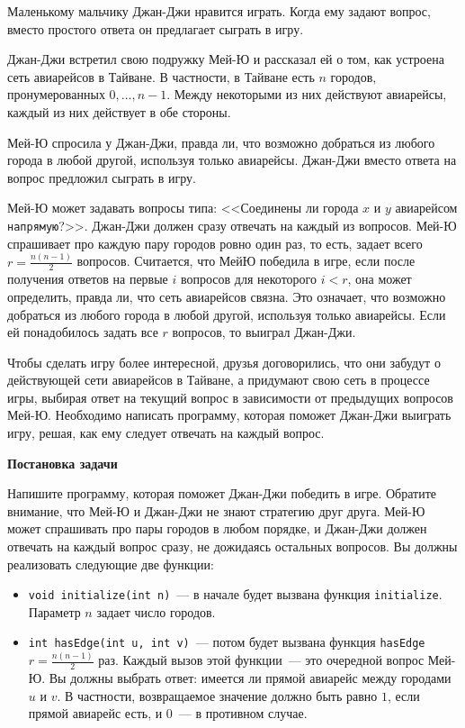 Маленькому мальчику Джан-Джи нравится играть. Когда ему задают вопрос, вместо простого
ответа он предлагает сыграть в игру.

Джан-Джи встретил свою подружку Мей-Ю и рассказал ей о том, как устроена сеть
авиарейсов в Тайване. В частности, в Тайване есть $n$ городов, пронумерованных $0, \ldots, n - 1$. Между некоторыми из них действуют авиарейсы, каждый из них действует в обе
стороны.

Мей-Ю спросила у Джан-Джи, правда ли, что возможно добраться из любого города в любой
другой, используя только авиарейсы. Джан-Джи вместо ответа на вопрос предложил сыграть в
игру.

Мей-Ю может задавать вопросы типа: <<Соединены ли города $x$ и $y$ авиарейсом \texttt{напрямую}?>>. Джан-Джи должен сразу отвечать на каждый из вопросов. Мей-Ю спрашивает про каждую пару городов ровно один раз, то есть, задает всего $r = \frac{n(n - 1)}{2}$ вопросов. Считается, что МейЮ победила в игре, если после получения ответов на первые $i$ вопросов для некоторого $i < r$, она может определить, правда ли, что сеть авиарейсов связна. Это означает, что возможно добраться из любого города в любой другой, используя только авиарейсы. Если ей понадобилось задать все $r$ вопросов, то выиграл Джан-Джи.

Чтобы сделать игру более интересной, друзья договорились, что они забудут о действующей
сети авиарейсов в Тайване, а придумают свою сеть в процессе игры, выбирая ответ на
текущий вопрос в зависимости от предыдущих вопросов Мей-Ю. Необходимо написать
программу, которая поможет Джан-Джи выиграть игру, решая, как ему следует отвечать на
каждый вопрос.

\textbf{Постановка задачи}

Напишите программу, которая поможет Джан-Джи победить в игре. Обратите внимание, что
Мей-Ю и Джан-Джи не знают стратегию друг друга. Мей-Ю может спрашивать про пары
городов в любом порядке, и Джан-Джи должен отвечать на каждый вопрос сразу, не
дожидаясь остальных вопросов. Вы должны реализовать следующие две функции:

\begin{itemize}
\item \texttt{void initialize(int n)}~--- в начале будет вызвана функция \texttt{initialize}. Параметр $n$ задает число городов.
\item \texttt{int hasEdge(int u, int v)}~--- потом будет вызвана функция \texttt{hasEdge} $r = \frac{n(n - 1)}{2}$ раз. Каждый вызов этой функции~--- это очередной вопрос Мей-Ю. Вы должны выбрать ответ: имеется ли прямой авиарейс между городами $u$ и $v$. В частности, возвращаемое значение должно быть равно $1$, если прямой авиарейс есть, и $0$~--- в противном случае.
\end{itemize}
